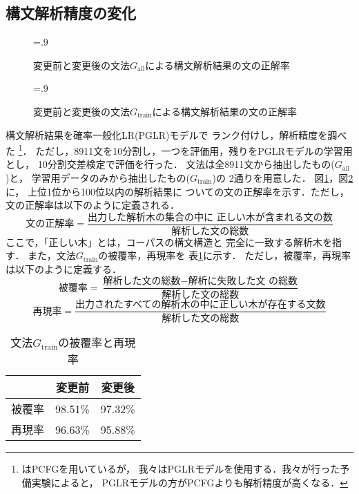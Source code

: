 \subsection{構文解析精度の変化}

\begin{figure}[p]
  \centering
  \epsfxsize=.9\textwidth
  \caption{変更前と変更後の文法$G_{\mbox{all}}$による構文解析結果の文の正解率}
  \label{fig:result_accuracy_close}
\end{figure}

\begin{figure}[p]
  \centering
  \epsfxsize=.9\textwidth
  \caption{変更前と変更後の文法$G_{\mbox{train}}$による構文解析結果の文の正解率}
  \label{fig:result_accuracy_open}
\end{figure}




構文解析結果を確率一般化LR(PGLR)モデル\cite{inui:98}で
ランク付けし，解析精度を調べた
\footnote{\cite{charniak:96,shirai:97}はPCFGを用いているが，
我々はPGLRモデルを使用する．我々が行った予備実験によると，
PGLRモデルの方がPCFGよりも解析精度が高くなる．}．
ただし，8911文を10分割し，一つを評価用，残りをPGLRモデルの学習用とし，
10分割交差検定で評価を行った．
文法は全8911文から抽出したもの($G_{\mbox{all}}$)と，
学習用データのみから抽出したもの($G_{\mbox{train}}$)の
2通りを用意した．
図\ref{fig:result_accuracy_close}，図\ref{fig:result_accuracy_open}に，
上位1位から100位以内の解析結果に
ついての文の正解率を示す．ただし，文の正解率は以下のように定義される．
\[\mbox{文の正解率} = \frac{\mbox{出力した解析木の集合の中に
    正しい木が含まれる文の数}}{\mbox{解析した文の総数}} \]
ここで，「正しい木」とは，コーパスの構文構造と
完全に一致する解析木を指す．
また，文法$G_{\mbox{train}}$の被覆率，再現率を
表\ref{tab:coverage_recall}に示す．
ただし，被覆率，再現率は以下のように定義する．
\[\mbox{被覆率} = \frac{\mbox{解析した文の総数}-\mbox{解析に失敗した文
    の総数}}{\mbox{解析した文の総数}}\]
\[\mbox{再現率} = \frac{\mbox{出力されたすべての解析木の中に正しい木が存在する文数}}
{\mbox{解析した文の総数}}\]

\begin{table}[tp]
  \centering
  \caption{文法$G_{\mbox{train}}$の被覆率と再現率}
  \label{tab:coverage_recall}
  \begin{tabular}{|c|r|r|}\hline
    & \multicolumn{1}{|c|}{変更前} & \multicolumn{1}{|c|}{変更後} \\\hline
    被覆率 & 98.51\% & 97.32\% \\\hline
    再現率 & 96.63\% & 95.88\% \\\hline
  \end{tabular}
\end{table}


